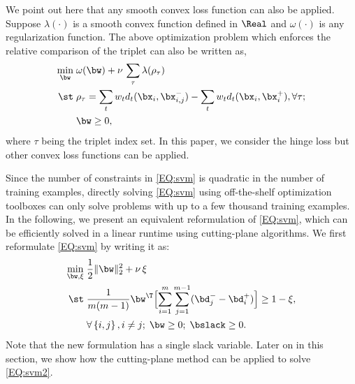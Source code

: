 \documentclass[10pt,twocolumn,letterpaper]{article}
\def\bxi{{\bx_i}}
\def\bxip{{\bx_i^{+}}}
\def\bxijm{{\bx_{i,j}^{-}}}
\def\bdip{{\bd_{i}^{+}}}
\def\bdjm{{\bd_{j}^{-}}}
\begin{document}
We point out here that any smooth convex loss function can also be applied.
Suppose $\lambda(\cdot)$ is a smooth convex function defined in $\Real$
and $\omega(\cdot)$ is any regularization function.
The above optimization problem which enforces the relative comparison
of the triplet can also be written as,
%
\begin{align}
    \label{EQ:eq2}
        \min_{ \bw }   \;
        &
        \omega( \bw ) + \nu \, \sum_{\tau} \lambda( \rho_{\tau} )    \\ \notag
        \st \; &
        \rho_{\tau} = \sum_t w_t d_t(\bxi,\bxijm) - \sum_{t} w_t d_t(\bxi,\bxip), \forall \tau ;
            \\ \notag
        \; &
        \bw \geq 0,
\end{align}
%
where $\tau$ being the triplet index set.
%
In this paper, we consider the hinge loss but other convex loss
functions \cite{Teo2007Scalable} can be applied.


Since the number of constraints in \eqref{EQ:svm}
is quadratic in the number of training examples,
directly solving \eqref{EQ:svm} using off-the-shelf
optimization toolboxes can only solve problems with up to
a few thousand training examples.
In the following, we present an equivalent reformulation of \eqref{EQ:svm},
which can be efficiently solved in a linear runtime using
cutting-plane algorithms.
We first reformulate \eqref{EQ:svm} by writing it as:
%
%
\begin{align}
    \label{EQ:svm2}
        \min_{ \bw, \xi }   \;
        &
         \frac{1}{2} \| \bw  \|_{2}^{2} + \nu \,  \xi   \\ \notag
        \st \; &
        \frac{1}{m(m-1)} \bw^\T \Bigl[ \sum_{i=1}^m \sum_{j=1}^{m-1}
                ( \bdjm - \bdip ) \Bigr] \geq 1 - \xi,
            \\ \notag
        \; &
        \forall \left\{i,j\right\}, i \neq j ; \; \bw \geq 0; \; \bslack \geq 0.
\end{align}
%
Note that the new formulation has a single slack variable.
Later on in this section, we show how the cutting-plane method
can be applied to solve \eqref{EQ:svm2}.


%
\end{document}
